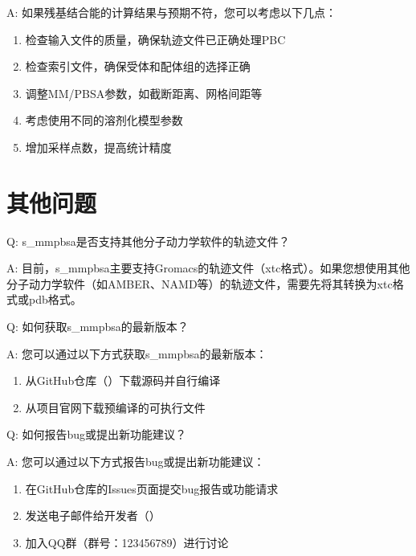 \documentclass[letterpaper,10pt,english]{sphinxmanual}
\begin{document}
\sphinxAtStartPar
A: 如果残基结合能的计算结果与预期不符，您可以考虑以下几点：
\begin{enumerate}
%
\item {} 
\sphinxAtStartPar
检查输入文件的质量，确保轨迹文件已正确处理PBC

\item {} 
\sphinxAtStartPar
检查索引文件，确保受体和配体组的选择正确

\item {} 
\sphinxAtStartPar
调整MM/PB\sphinxhyphen{}SA参数，如截断距离、网格间距等

\item {} 
\sphinxAtStartPar
考虑使用不同的溶剂化模型参数

\item {} 
\sphinxAtStartPar
增加采样点数，提高统计精度

\end{enumerate}


\section{其他问题}
\label{\detokenize{faq:id6}}
\sphinxAtStartPar
Q: s\_mmpbsa是否支持其他分子动力学软件的轨迹文件？

\sphinxAtStartPar
A: 目前，s\_mmpbsa主要支持Gromacs的轨迹文件（xtc格式）。如果您想使用其他分子动力学软件（如AMBER、NAMD等）的轨迹文件，需要先将其转换为xtc格式或pdb格式。

\sphinxAtStartPar
Q: 如何获取s\_mmpbsa的最新版本？

\sphinxAtStartPar
A: 您可以通过以下方式获取s\_mmpbsa的最新版本：
\begin{enumerate}
%
\item {} 
\sphinxAtStartPar
从GitHub仓库（）下载源码并自行编译

\item {} 
\sphinxAtStartPar
从项目官网下载预编译的可执行文件

\end{enumerate}

\sphinxAtStartPar
Q: 如何报告bug或提出新功能建议？

\sphinxAtStartPar
A: 您可以通过以下方式报告bug或提出新功能建议：
\begin{enumerate}
%
\item {} 
\sphinxAtStartPar
在GitHub仓库的Issues页面提交bug报告或功能请求

\item {} 
\sphinxAtStartPar
发送电子邮件给开发者（）

\item {} 
\sphinxAtStartPar
加入QQ群（群号：123456789）进行讨论

\end{enumerate}
\end{document}
